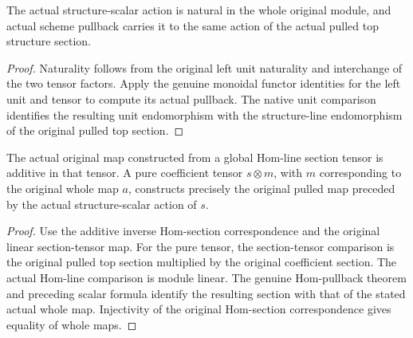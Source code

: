 \begin{lemma}\label{lem:kn-original-line-structure-scalar-pullback}
\leanok
{}
The actual structure-scalar action is natural in the whole original module,
and actual scheme pullback carries it to the same action of the actual
pulled top structure section.
\end{lemma}
\begin{proof}
Naturality follows from the original left unit naturality and interchange
of the two tensor factors. Apply the genuine monoidal functor identities
for the left unit and tensor to compute its actual pullback. The native
unit comparison identifies the resulting unit endomorphism with the
structure-line endomorphism of the original pulled top section.
\end{proof}

\begin{lemma}\label{lem:kn-original-line-map-tensor-formula}
\leanok
{}
The actual original map constructed from a global Hom-line section tensor
is additive in that tensor. A pure coefficient tensor $s\otimes m$, with
$m$ corresponding to the original whole map $a$, constructs precisely the
original pulled map preceded by the actual structure-scalar action of $s$.
\end{lemma}
\begin{proof}
Use the additive inverse Hom-section correspondence and the original linear
section-tensor map. For the pure tensor, the section-tensor comparison is
the original pulled top section multiplied by the original coefficient
section. The actual Hom-line comparison is module linear. The genuine
Hom-pullback theorem and preceding scalar formula identify the resulting
section with that of the stated actual whole map. Injectivity of the
original Hom-section correspondence gives equality of whole maps.
\end{proof}

